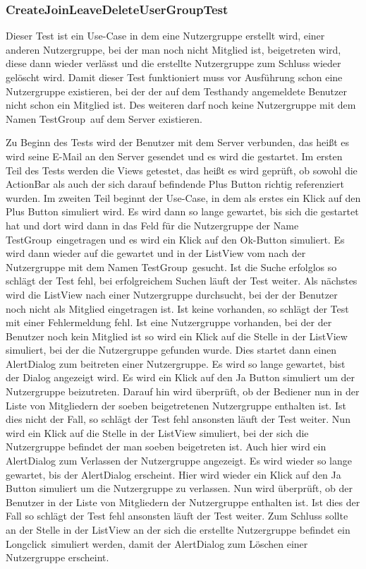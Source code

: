 \subsubsection{CreateJoinLeaveDeleteUserGroupTest}
Dieser Test ist ein Use-Case in dem eine Nutzergruppe erstellt wird, einer anderen Nutzergruppe, bei der man noch nicht Mitglied ist, beigetreten wird, diese dann wieder verlässt und die erstellte Nutzergruppe zum Schluss wieder gelöscht wird. Damit dieser Test funktioniert muss vor Ausführung schon eine Nutzergruppe existieren, bei der der auf dem Testhandy angemeldete Benutzer nicht schon ein Mitglied ist. Des weiteren darf noch keine Nutzergruppe mit dem Namen \glqq TestGroup\grqq\ auf dem Server existieren.

Zu Beginn des Tests wird der Benutzer mit dem Server verbunden, das heißt es wird seine E-Mail an den Server gesendet und es wird die  gestartet. Im ersten Teil des Tests werden die Views getestet, das heißt es wird geprüft, ob sowohl die ActionBar als auch der sich darauf befindende Plus Button richtig referenziert wurden. Im zweiten Teil beginnt der Use-Case, in dem als erstes ein Klick auf den Plus Button simuliert wird. Es wird dann so lange gewartet, bis sich die  gestartet hat und dort wird dann in das Feld für die Nutzergruppe der Name \glqq TestGroup\grqq\ eingetragen und es wird ein Klick auf den \glqq Ok\grqq-Button simuliert. Es wird dann wieder auf die  gewartet und in der ListView vom  nach der Nutzergruppe mit dem Namen \glqq TestGroup\grqq\ gesucht. Ist die Suche erfolglos so schlägt der Test fehl, bei erfolgreichem Suchen läuft der Test weiter. Als nächstes wird die ListView nach einer Nutzergruppe durchsucht, bei der der Benutzer noch nicht als Mitglied eingetragen ist. Ist keine vorhanden, so schlägt der Test mit einer Fehlermeldung fehl. Ist eine Nutzergruppe vorhanden, bei der der Benutzer noch kein Mitglied ist so wird ein Klick auf die Stelle in der ListView simuliert, bei der die Nutzergruppe gefunden wurde. Dies startet dann einen AlertDialog zum beitreten einer Nutzergruppe. Es wird so lange gewartet, bist der Dialog angezeigt wird. Es wird ein Klick auf den Ja Button simuliert um der Nutzergruppe beizutreten. Darauf hin wird überprüft, ob der Bediener nun in der Liste von Mitgliedern der soeben beigetretenen Nutzergruppe enthalten ist. Ist dies nicht der Fall, so schlägt der Test fehl ansonsten läuft der Test weiter. Nun wird ein Klick auf die Stelle in der ListView simuliert, bei der sich die Nutzergruppe befindet der man soeben beigetreten ist. Auch hier wird ein AlertDialog zum Verlassen der Nutzergruppe angezeigt. Es wird wieder so lange gewartet, bis der AlertDialog erscheint. Hier wird wieder ein Klick auf den Ja Button simuliert um die Nutzergruppe zu verlassen. Nun wird überprüft, ob der Benutzer in der Liste von Mitgliedern der Nutzergruppe enthalten ist. Ist dies der Fall so schlägt der Test fehl ansonsten läuft der Test weiter. Zum Schluss sollte an der Stelle in der ListView an der sich die erstellte Nutzergruppe befindet ein \glqq Longclick\grqq\ simuliert werden, damit der AlertDialog zum Löschen einer Nutzergruppe erscheint. 